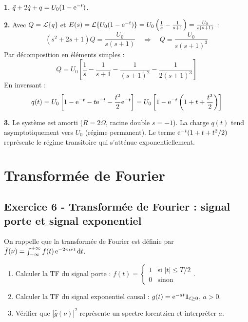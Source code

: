 \documentclass[12pt,a4paper]{article}
\begin{document}
\begin{boitecorrige}
\textbf{1.} $\ddot{q} + 2\dot{q} + q = U_0(1-\mathrm{e}^{-t})$.

\textbf{2.} Avec $Q=\mathcal{L}\{q\}$ et $E(s)=\mathcal{L}\{U_0(1-\mathrm{e}^{-t})\}=U_0\left(\frac{1}{s}-\frac{1}{s+1}\right)=\frac{U_0}{s(s+1)}$ :
\[
(s^2+2s+1)Q = \frac{U_0}{s(s+1)} \quad\Rightarrow\quad Q = \frac{U_0}{s(s+1)^3}
\]
Par décomposition en éléments simples :
\[
Q = U_0\left[\frac{1}{s} - \frac{1}{s+1} - \frac{1}{(s+1)^2} - \frac{1}{2(s+1)^3}\right]
\]
En inversant :
\[
q(t) = U_0\left[1 - \mathrm{e}^{-t} - t\mathrm{e}^{-t} - \frac{t^2}{2}\mathrm{e}^{-t}\right] = U_0\left[1 - \mathrm{e}^{-t}\left(1+t+\frac{t^2}{2}\right)\right]
\]

\textbf{3.} Le système est amorti ($R=2\Omega$, racine double $s=-1$). La charge $q(t)$ tend asymptotiquement vers $U_0$ (régime permanent). Le terme $\mathrm{e}^{-t}(1+t+t^2/2)$ représente le régime transitoire qui s'atténue exponentiellement.
\end{boitecorrige}

\section{Transformée de Fourier}

\subsection*{Exercice 6 - Transformée de Fourier : signal porte et signal exponentiel \niveau{\moyen}}

\begin{boiteexercice}
On rappelle que la transformée de Fourier est définie par $\hat{f}(\nu) = \int_{-\infty}^{+\infty} f(t)\,\mathrm{e}^{-2\pi i\nu t}\,\mathrm{d} t$.
\begin{enumerate}
  \item Calculer la TF du signal porte : $f(t) = \begin{cases}1 & \text{si } |t| \leq T/2\\0 & \text{sinon}\end{cases}$.
  \item Calculer la TF du signal exponentiel causal : $g(t) = \mathrm{e}^{-at}\mathbf{1}_{t\geq0}$, $a > 0$.
  \item Vérifier que $|\hat{g}(\nu)|^2$ représente un spectre lorentzien et interpréter $a$.
\end{enumerate}
\end{boiteexercice}
\end{document}
